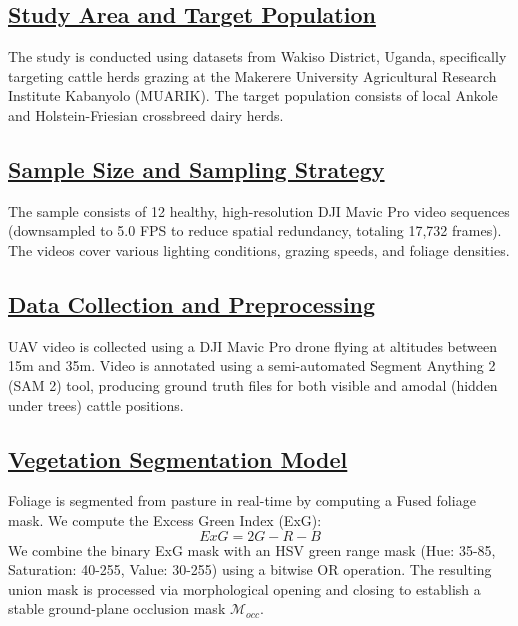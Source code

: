 \documentclass[12pt]{article}
\begin{document}
\subsection*{\underline{\textbf{Study Area and Target Population}}}
The study is conducted using datasets from Wakiso District, Uganda, specifically targeting cattle herds grazing at the Makerere University Agricultural Research Institute Kabanyolo (MUARIK). The target population consists of local Ankole and Holstein-Friesian crossbreed dairy herds.

\subsection*{\underline{\textbf{Sample Size and Sampling Strategy}}}
The sample consists of 12 healthy, high-resolution DJI Mavic Pro video sequences (downsampled to 5.0 FPS to reduce spatial redundancy, totaling 17,732 frames). The videos cover various lighting conditions, grazing speeds, and foliage densities.

\subsection*{\underline{\textbf{Data Collection and Preprocessing}}}
UAV video is collected using a DJI Mavic Pro drone flying at altitudes between 15m and 35m. Video is annotated using a semi-automated Segment Anything 2 (SAM 2) tool, producing ground truth files for both visible and amodal (hidden under trees) cattle positions.

\subsection*{\underline{\textbf{Vegetation Segmentation Model}}}
Foliage is segmented from pasture in real-time by computing a Fused foliage mask. We compute the Excess Green Index (ExG):
\begin{equation}
ExG = 2G - R - B
\end{equation}
We combine the binary ExG mask with an HSV green range mask (Hue: 35-85, Saturation: 40-255, Value: 30-255) using a bitwise OR operation. The resulting union mask is processed via morphological opening and closing to establish a stable ground-plane occlusion mask $\mathcal{M}_{occ}$.
\end{document}
